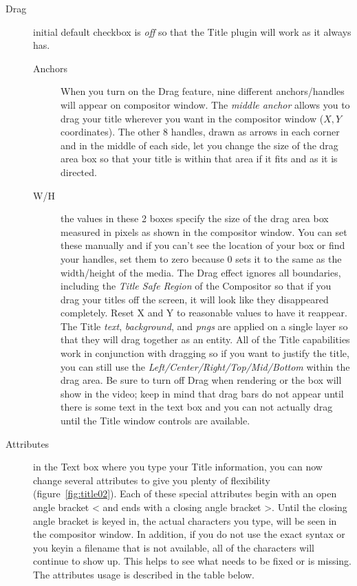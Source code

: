 {\begin{description}
    \item[Drag] initial default checkbox is \textit{off} so that the Title plugin will work as it always has.
    \begin{description}
        \item[Anchors] When you turn on the Drag feature, nine different anchors/handles will appear on compositor window. The \textit{middle anchor} allows you to drag your title wherever you want in the compositor window ($X, Y$ coordinates). The other 8 handles, drawn as arrows in each corner and in the middle of each side, let you change the size of the drag area box so that your title is within that area if it fits and as it is directed.
        \item[W/H] the values in these 2 boxes specify the size of the drag area box measured in pixels as shown in the compositor window. You can set these manually and if you can't see the location of your box or find your handles, set them to zero because $0$ sets it to the same as the width/height of the media.
        The Drag effect ignores all boundaries, including the \textit{Title Safe Region} of the Compositor so that if you drag your titles off the screen, it will look like they disappeared completely. Reset X and Y to reasonable values to have it reappear. The Title \textit{text}, \textit{background}, and \textit{pngs} are applied on a single layer so that they will drag together as an entity. All of the Title capabilities work in conjunction with dragging so if you want to justify the title, you can still use the \textit{Left/Center/Right/Top/Mid/Bottom} within the drag area. Be sure to turn off Drag when rendering or the box will show in the video; keep in mind that drag bars do not appear until there is some text in the text box and you can not actually drag until the Title window controls are available.
    \end{description}
    \item[Attributes] in the Text box where you type your Title information, you can now change several attributes to give you plenty of flexibility (figure~\ref{fig:title02}). Each of these special attributes begin with an open angle bracket < and ends with a closing angle bracket >. Until the closing angle bracket is keyed in, the actual characters you type, will be seen in the compositor window. In addition, if you do not use the exact syntax or you keyin a filename that is not available, all of the characters will continue to show up. This helps to see what needs to be fixed or is missing. The attributes usage is described in the table below.
\end{description}

}
